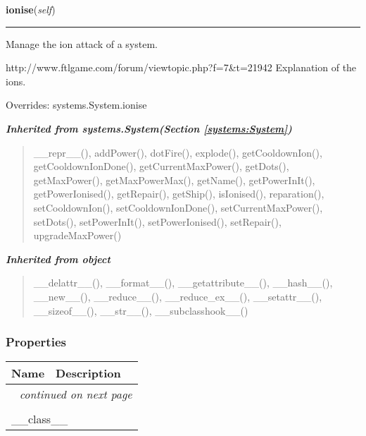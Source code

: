     \vspace{0.5ex}

\hspace{.8\funcindent}\begin{boxedminipage}{\funcwidth}

    \raggedright \textbf{ionise}(\textit{self})

    \vspace{-1.5ex}

    \rule{\textwidth}{0.5\fboxrule}
\setlength{\parskip}{2ex}
    Manage the ion attack of a system.

    http://www.ftlgame.com/forum/viewtopic.php?f=7\&t=21942 Explanation of 
    the ions.

\setlength{\parskip}{1ex}
      Overrides: systems.System.ionise

    \end{boxedminipage}


\large{\textbf{\textit{Inherited from systems.System\textit{(Section \ref{systems:System})}}}}

\begin{quote}
\_\_repr\_\_(), addPower(), dotFire(), explode(), getCooldownIon(), getCooldownIonDone(), getCurrentMaxPower(), getDots(), getMaxPower(), getMaxPowerMax(), getName(), getPowerInIt(), getPowerIonised(), getRepair(), getShip(), isIonised(), reparation(), setCooldownIon(), setCooldownIonDone(), setCurrentMaxPower(), setDots(), setPowerInIt(), setPowerIonised(), setRepair(), upgradeMaxPower()
\end{quote}

\large{\textbf{\textit{Inherited from object}}}

\begin{quote}
\_\_delattr\_\_(), \_\_format\_\_(), \_\_getattribute\_\_(), \_\_hash\_\_(), \_\_new\_\_(), \_\_reduce\_\_(), \_\_reduce\_ex\_\_(), \_\_setattr\_\_(), \_\_sizeof\_\_(), \_\_str\_\_(), \_\_subclasshook\_\_()
\end{quote}


  \subsubsection{Properties}

    \vspace{-1cm}
\hspace{\varindent}\begin{longtable}{|p{\varnamewidth}|p{\vardescrwidth}|l}
\cline{1-2}
\cline{1-2} \centering \textbf{Name} & \centering \textbf{Description}& \\
\cline{1-2}
\endhead\cline{1-2}\multicolumn{3}{r}{\small\textit{continued on next page}}\\\endfoot\cline{1-2}
\endlastfoot\multicolumn{2}{|l|}{\textit{Inherited from object}}\\
\multicolumn{2}{|p{\varwidth}|}{\raggedright \_\_class\_\_}\\
\cline{1-2}
\end{longtable}

